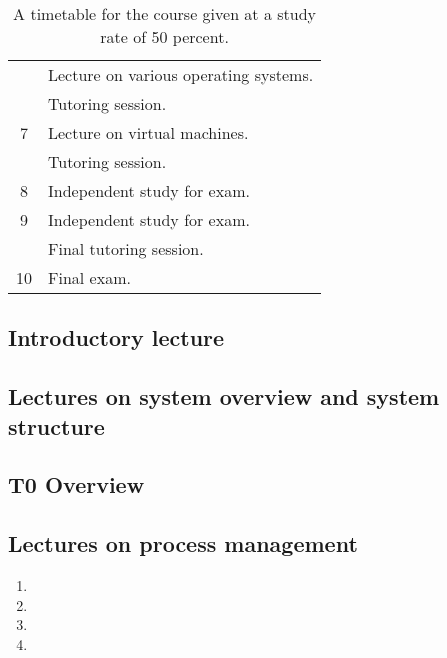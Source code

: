 \documentclass[a4paper,logo]{miunart}
\begin{document}
\begin{table}
\begin{tabular}{cp{10cm}}
        & Lecture on various operating systems.\\
        & Tutoring session.\\
    \midrule
    7
        & Lecture on virtual machines.\\
        & Tutoring session.\\
    \midrule
    8
        & Independent study for exam.\\
    \midrule
    9
        & Independent study for exam.\\
        & Final tutoring session.\\
    \midrule
    10
        & Final exam.\\
    \bottomrule
  \end{tabular}
  \caption{A timetable for the course given at a study rate of 50 percent.}
  \label{tbl:Timetable}
\end{table}

\subsection{Introductory lecture}


\subsection{Lectures on system overview and system structure}


\subsection{T0 Overview}


\subsection{Lectures on process management}
\begin{enumerate}
  \item 

  \item 

  \item 

  \item 
\end{enumerate}
\end{document}
